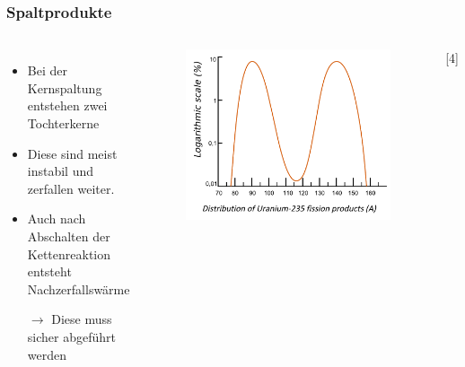 \documentclass{beamer}[9pt]
\begin{document}
\begin{frame}
\frametitle{Spaltprodukte}
\begin{columns}

\begin{itemize}

\item Bei der Kernspaltung entstehen zwei Tochterkerne
\item Diese sind meist instabil und zerfallen weiter.
\item Auch nach Abschalten der Kettenreaktion entsteht Nachzerfallswärme
\item[$\rightarrow$] Diese muss sicher abgeführt werden
\end{itemize}
\begin{figure}

\includegraphics[scale=.45]{fission_products.pdf}
\end{figure}
\hspace{.5\columnwidth}[4]
\end{columns}
\end{frame}
\end{document}
